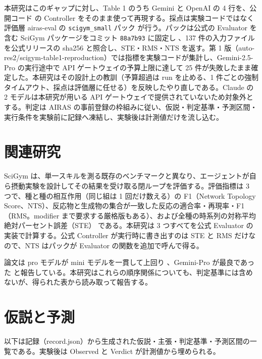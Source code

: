 \documentclass{article}
\begin{document}
本研究はこのギャップに対し、Table 1 のうち Gemini と OpenAI の 4 行を、公開コード \citep{h4duan-2025-scigym} の Controller をそのまま使って再現する。採点は実験コードではなく評価層 airas-eval の \texttt{scigym\_small} パック \citep{airasorg-2026-airas} が行う。パックは公式の Evaluator を含む SciGym パッケージをコミット \texttt{88a7b93} に固定し \cite[s3.p1]{airasorg-2026-airas}、137 件の入力ファイルを公式リリースの sha256 と照合し、STE・RMS・NTS を返す。第 1 版（auto-res2/scigym-table1-reproduction）では指標を実験コードが集計し、Gemini-2.5-Pro の実行途中で API ゲートウェイの予算上限に達して 25 件が失敗したまま確定した。本研究はその設計上の教訓（予算超過は run を止める、1 件ごとの強制タイムアウト、採点は評価層に任せる）を反映したやり直しである。Claude の 2 モデルは本研究が用いる API ゲートウェイで提供されていないため対象外とする。判定は AIRAS の事前登録の枠組みに従い、仮説・判定基準・予測区間・実行条件を実験前に記録へ凍結し、実験後は計測値だけを流し込む。

\section{関連研究}
\label{sec:related}
SciGym \citep{duan-2025-measuring} は、単一スキルを測る既存のベンチマークと異なり、エージェントが自ら摂動実験を設計してその結果を受け取る閉ループを評価する。評価指標は 3 つで、種と種の相互作用（同じ組は 1 回だけ数える）の F1（Network Topology Score、NTS）\cite[s1.p11]{duan-2025-measuring}、反応物と生成物の集合が一致した反応の適合率・再現率・F1（RMS。modifier まで要求する厳格版もある）\cite[s1.p8]{duan-2025-measuring}、および全種の時系列の対称平均絶対パーセント誤差（STE）\cite[s1.p9]{duan-2025-measuring} である。本研究は 3 つすべてを公式 Evaluator の実装で計算する。公式 Controller が実行時に書き出すのは STE と RMS だけなので、NTS はパックが Evaluator の関数を追加で呼んで得る。

論文は pro モデルが mini モデルを一貫して上回り \cite[s1.p6]{duan-2025-measuring}、Gemini-Pro が最良であった \cite[s1.p7]{duan-2025-measuring} と報告している。本研究はこれらの順序関係についても、判定基準には含めないが、得られた表から読み取って報告する。

\section{仮説と予測}
\label{sec:hypothesis}
以下は記録（record.json）から生成された仮説・主張・判定基準・予測区間の一覧である。実験後は Observed と Verdict が計測値から埋められる。
\end{document}
